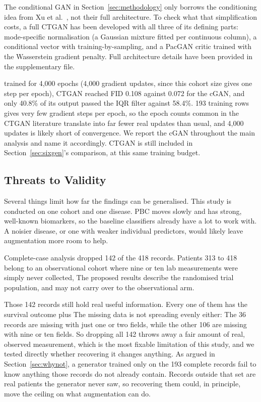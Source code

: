 The conditional GAN in Section~\ref{sec:methodology} only borrows the conditioning idea from Xu et al.\ \cite{xu2019}, not their full architecture. To check what that simplification costs, a full CTGAN has been developed with all three of its defining parts: mode-specific normalisation (a Gaussian mixture fitted per continuous column), a conditional vector with training-by-sampling, and a PacGAN critic trained with the Wasserstein gradient penalty. Full architecture details have been provided in the supplementary file.

 trained for 4,000 epochs (4,000 gradient updates, since this cohort size gives one step per epoch), CTGAN reached FID 0.108 against 0.072 for the cGAN, and only 40.8\% of its output passed the IQR filter against 58.4\%.  193 training rows gives very few gradient steps per epoch, so the epoch counts common in the CTGAN literature translate into far fewer real updates than usual, and 4,000 updates is likely short of convergence. We report the cGAN throughout the main analysis and name it accordingly. CTGAN is still included  in Section~\ref{sec:sixgen}'s comparison, at this same training budget.

\subsection{Threats to Validity}

Several things limit how far the findings can be generalised. This study is conducted on one cohort and one disease. PBC moves slowly and has strong, well-known biomarkers, so the baseline classifiers already have a lot to work with. A noisier disease, or one with weaker individual predictors, would likely leave augmentation more room to help.

Complete-case analysis dropped 142 of the 418 records. Patients 313 to 418 belong to an observational cohort where nine or ten lab measurements were simply never collected,  The proposed results describe the randomised trial population, and may not carry over to the observational arm.

Those 142 records still hold real useful information. Every one of them has the survival outcome plus  The missing data is not spreading evenly either: The 36 records are missing with just one or two fields, while the other 106 are missing with nine or ten fields. So dropping all 142 throws away a fair amount of real, observed measurement, which is the most fixable limitation of this study, and we tested directly whether recovering it changes anything. As argued in Section~\ref{sec:whynot}, a generator trained only on the 193 complete records fail to know anything those records do not already contain. Records outside that set are real patients the generator never saw, so recovering them could, in principle, move the ceiling on what augmentation can do.


